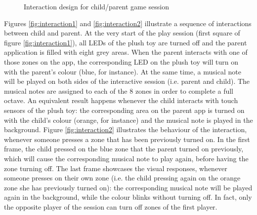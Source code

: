 \begin{figure}[H]
    \centering
    \hfill
    \hfill
    \caption{Interaction design for child/parent game session } 
    \label{fig:game_id}
\end{figure}

\medskip
Figures \ref{fig:interaction1} and \ref{fig:interaction2} illustrate a sequence of interactions between child and parent. At the very start of the play session (first square of figure \ref{fig:interaction1}), all LEDs of the plush toy are turned off and the parent application is filled with eight grey areas. When the parent interacts with one of those zones on the app, the corresponding LED on the plush toy will turn on with the parent's colour (blue, for instance). At the same time, a musical note will be played on both sides of the interactive session (i.e. parent and child). The musical notes are assigned to each of the 8 zones in order to complete a full octave. An equivalent result happens whenever the child interacts with touch sensors of the plush toy: the corresponding area on the parent app is turned on with the child's colour (orange, for instance) and the musical note is played in the background. Figure \ref{fig:interaction2} illustrates the behaviour of the interaction, whenever someone presses a zone that has been previously turned on. In the first frame, the child pressed on the blue zone that the parent turned on previously, which will cause the corresponding musical note to play again, before having the zone turning off. The last frame showcases the visual responses, whenever someone presses on their own zone (i.e. the child pressing again on the orange zone she has previously turned on): the corresponding musical note will be played again in the background, while the colour blinks without turning off. In fact, only the opposite player of the session can turn off zones of the first player.%

